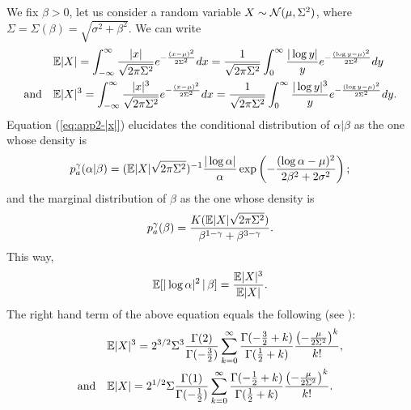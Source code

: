 We fix $\beta>0$, let us consider a random variable $X\sim\mathcal{N}(\mu,\Sigma^2)$, where $\Sigma=\Sigma(\beta) = \sqrt{\sigma^2+\beta^2}$. We can write
    \begin{align}
       &\mathbb{E}|X| = \int_{-\infty}^\infty  \frac{|x|}{\sqrt{2\pi\Sigma^2}}e^{-\frac{(x-\mu)^2}{2\Sigma^2}}dx = \frac{1}{\sqrt{2\pi\Sigma^2}} \int_0^\infty \frac{|\log y|}{y}e^{-\frac{(\log y-\mu)^2}{2\Sigma^2}}dy\label{eq:app2-|x|}\\
       \text{and}\quad &
            \mathbb{E}|X|^3 = \int_{-\infty}^\infty  \frac{|x|^3}{\sqrt{2\pi\Sigma^2}}e^{-\frac{(x-\mu)^2}{2\Sigma^2}}dx = \frac{1}{\sqrt{2\pi\Sigma^2}} \int_0^\infty \frac{|\log y|^3}{y}e^{-\frac{(\log y-\mu)^2}{2\Sigma^2}}dy.
    \end{align}
Equation (\ref{eq:app2-|x|}) elucidates the conditional distribution of $\alpha|\beta$ as the one whose density is
    \begin{equation}
        p^\gamma_a(\alpha|\beta) = (\mathbb{E}|X|\sqrt{2\pi\Sigma^2})^{-1}\frac{|\log\alpha|}{\alpha} \exp\left(-\frac{(\log\alpha-\mu)^2}{2\beta^2+2\sigma^2}  \right);
    \end{equation}
and the marginal distribution of $\beta$ as the one whose density is
    \begin{equation}
        p_a^\gamma(\beta) = \frac{K(\mathbb{E}|X|\sqrt{2\pi\Sigma^2})}{\beta^{1-\gamma}+\beta^{3-\gamma}} .
    \end{equation}
This way,
    \begin{equation}\label{eq:app-Elog2|beta}
        \mathbb{E}[|\log\alpha|^2\,|\,\beta] = \frac{\mathbb{E}|X|^3}{\mathbb{E}|X|}.
    \end{equation}
The right hand term of the above equation equals the following (see \cite{winkelbauer2014momentsabsolutemomentsnormal}):
    \begin{equation}
        \begin{aligned}
        &\mathbb{E}|X|^3 =  2^{3/2}\Sigma^3 \frac{\Gamma(2)}{\Gamma(-\frac{3}{2})} \sum_{k=0}^\infty \frac{\Gamma(-\frac{3}{2}+k)}{\Gamma(\frac{1}{2}+k)}\frac{\left(-\frac{\mu}{2\Sigma^2}\right)^k}{k!}, \\
        \text{and}\quad& 
            \mathbb{E}|X| =  2^{1/2}\Sigma \frac{\Gamma(1)}{\Gamma(-\frac{1}{2})} \sum_{k=0}^\infty \frac{\Gamma(-\frac{1}{2}+k)}{\Gamma(\frac{1}{2}+k)}\frac{\left(-\frac{\mu}{2\Sigma^2}\right)^k}{k!}.
        \end{aligned}
    \end{equation}
